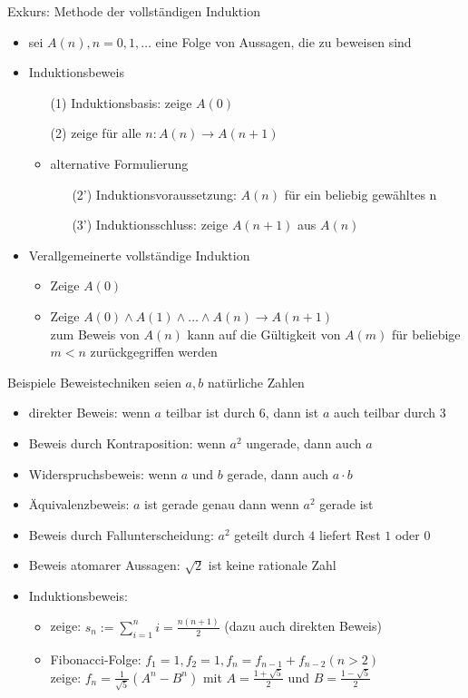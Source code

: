 \begin{frame}{Exkurs: Methode der vollständigen Induktion}
	\begin{itemize}
		\item sei $A(n), n=0,1,\ldots$ eine Folge von Aussagen, die zu beweisen sind
		\item Induktionsbeweis
		\begin{itemize}
			\item[(1)] Induktionsbasis: zeige $A(0)$
			\item[(2)] zeige für alle $n: A(n) \rightarrow A(n+1)$
			\item alternative Formulierung
			\begin{itemize}
				\item[(2')] Induktionsvoraussetzung: $A(n)$ für ein beliebig gewähltes n
				\item[(3')] Induktionsschluss: zeige $A(n+1)$ aus $A(n)$
			\end{itemize}
		\end{itemize}
		\item Verallgemeinerte vollständige Induktion
		\begin{itemize}
			\item Zeige $A(0)$
			\item Zeige $A(0) \land A(1) \land \ldots \land A(n) \rightarrow A(n+1)$\\
			zum Beweis von $A(n)$ kann auf die Gültigkeit von $A(m)$ für beliebige $m<n$ zurückgegriffen werden
		\end{itemize}
	\end{itemize}
\end{frame}

\begin{frame}{Beispiele Beweistechniken}
	seien $a, b$ natürliche Zahlen
	\begin{itemize}
		\item direkter Beweis: wenn $a$ teilbar ist durch 6, dann ist $a$ auch teilbar durch 3
		\item Beweis durch Kontraposition: wenn $a^2$ ungerade, dann auch $a$
		\item Widerspruchsbeweis: wenn $a$ und $b$ gerade, dann auch $a \cdot b$
		\item Äquivalenzbeweis: $a$ ist gerade genau dann wenn $a^2$ gerade ist
		\item Beweis durch Fallunterscheidung: $a^2$ geteilt durch $4$ liefert Rest $1$ oder $0$
		\item Beweis atomarer Aussagen: $\sqrt{2}$ ist keine rationale Zahl
		\item Induktionsbeweis:
		\begin{itemize}
			\item zeige: $s_n := \sum_{i=1}^{n}i=\frac{n(n+1)}{2}$ (dazu auch direkten Beweis)
			\item Fibonacci-Folge: $f_1=1, f_2=1, f_n=f_{n-1}+f_{n-2} (n>2)$\\
			zeige: $f_n=\frac{1}{\sqrt{5}}(A^n-B^n)$ mit $A=\frac{1+\sqrt{5}}{2}$ und $B=\frac{1-\sqrt{5}}{2}$
		\end{itemize}
	\end{itemize}
\end{frame}